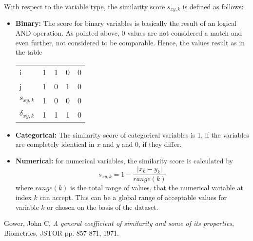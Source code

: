 \documentclass[11pt]{article}
\begin{document}
With respect to the variable type, the similarity score $s_{xy,k}$ is defined as follows:
\begin{itemize}
	\item \textbf{Binary:} The score for binary variables is basically the result of an logical AND operation. As pointed above, 0 values are not considered a match and even further, not considered to be comparable. Hence, the values result as in the table
	\begin{center}\begin{tabular}{l | c c c r}
		i & 1 & 1 & 0 & 0 \\
		j & 1 & 0 & 1 & 0 \\
		\hline
		$s_{xy,k}$ & 1 & 0 & 0 & 0 \\
		$\delta_{xy,k}$ & 1 & 1 & 1 & 0
	\end{tabular}\end{center} 
    
    \item \textbf{Categorical:} The similarity score of categorical variables is 1, if the variables are completely identical in $x$ and $y$ and 0, if they differ.
    
    \item \textbf{Numerical:} for numerical variables, the similarity score is calculated by
    \begin{equation*}
      s_{xy,k} = 1 - \frac{\vert x_k - y_k \vert}{range(k)}
    \end{equation*}
    where $range(k)$ is the total range of values, that the numerical variable at index $k$ can accept. This can be a global range of acceptable values for variable $k$ or chosen on the basis of the dataset.
\end{itemize}


\begin{thebibliography}{9}
	
	Gower, John C,
	\emph{A general coefficient of similarity and some of its properties},
	Biometrics, JSTOR pp. 857-871,
	1971.
	
\end{thebibliography}
\end{document}
